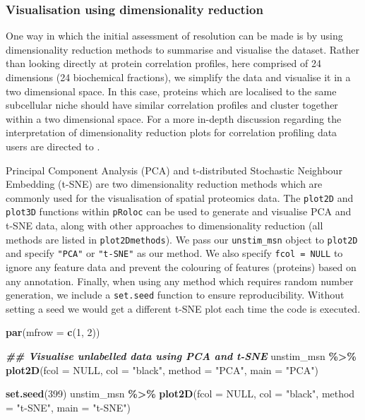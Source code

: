 \documentclass[9pt,a4paper,]{extarticle}
\newenvironment{Shaded}{\begin{snugshade}}{\end{snugshade}}
\newcommand{\AttributeTok}[1]{\textcolor[rgb]{0.13,0.29,0.53}{#1}}
\newcommand{\ConstantTok}[1]{\textcolor[rgb]{0.56,0.35,0.01}{#1}}
\newcommand{\DecValTok}[1]{\textcolor[rgb]{0.00,0.00,0.81}{#1}}
\newcommand{\DocumentationTok}[1]{\textcolor[rgb]{0.56,0.35,0.01}{\textbf{\textit{#1}}}}
\newcommand{\FunctionTok}[1]{\textcolor[rgb]{0.13,0.29,0.53}{\textbf{#1}}}
\newcommand{\NormalTok}[1]{#1}
\newcommand{\SpecialCharTok}[1]{\textcolor[rgb]{0.81,0.36,0.00}{\textbf{#1}}}
\newcommand{\StringTok}[1]{\textcolor[rgb]{0.31,0.60,0.02}{#1}}
\begin{document}
\subsubsection{Visualisation using dimensionality reduction}\label{visualisation-using-dimensionality-reduction}

One way in which the initial assessment of resolution can be made is by using
dimensionality reduction methods to summarise and visualise the dataset. Rather
than looking directly at protein correlation profiles, here comprised of 24
dimensions (24 biochemical fractions), we simplify the data and visualise it in
a two dimensional space. In this case, proteins which are localised to the same
subcellular niche should have similar correlation profiles and cluster
together within a two dimensional space. For a more in-depth discussion regarding
the interpretation of dimensionality reduction plots for correlation profiling
data users are directed to \citet{Gatto2019}.

Principal Component Analysis (PCA) and t-distributed Stochastic Neighbour Embedding (t-SNE)
are two dimensionality reduction methods which are commonly used for the
visualisation of spatial proteomics data. The \texttt{plot2D} and \texttt{plot3D} functions within
\texttt{pRoloc} can be used to generate and visualise PCA and t-SNE data, along with other
approaches to dimensionality reduction (all methods are listed in \texttt{plot2Dmethods}).
We pass our \texttt{unstim\_msn} object to \texttt{plot2D} and specify \texttt{"PCA"} or \texttt{"t-SNE"} as
our method. We also specify \texttt{fcol\ =\ NULL} to ignore any feature data and prevent
the colouring of features (proteins) based on any annotation. Finally, when using
any method which requires random number generation, we include a \texttt{set.seed}
function to ensure reproducibility. Without setting a seed we would get a different
t-SNE plot each time the code is executed.

\begin{Shaded}
\begin{Highlighting}[]
\FunctionTok{par}\NormalTok{(}\AttributeTok{mfrow =} \FunctionTok{c}\NormalTok{(}\DecValTok{1}\NormalTok{, }\DecValTok{2}\NormalTok{))}

\DocumentationTok{\#\# Visualise unlabelled data using PCA and t{-}SNE}
\NormalTok{unstim\_msn }\SpecialCharTok{\%\textgreater{}\%}
  \FunctionTok{plot2D}\NormalTok{(}\AttributeTok{fcol =} \ConstantTok{NULL}\NormalTok{, }\AttributeTok{col =} \StringTok{"black"}\NormalTok{, }\AttributeTok{method =} \StringTok{"PCA"}\NormalTok{, }\AttributeTok{main =} \StringTok{"PCA"}\NormalTok{)}

\FunctionTok{set.seed}\NormalTok{(}\DecValTok{399}\NormalTok{)}
\NormalTok{unstim\_msn }\SpecialCharTok{\%\textgreater{}\%}
  \FunctionTok{plot2D}\NormalTok{(}\AttributeTok{fcol =} \ConstantTok{NULL}\NormalTok{, }\AttributeTok{col =} \StringTok{"black"}\NormalTok{, }\AttributeTok{method =} \StringTok{"t{-}SNE"}\NormalTok{, }\AttributeTok{main =} \StringTok{"t{-}SNE"}\NormalTok{)}
\end{Highlighting}
\end{Shaded}
\end{document}
